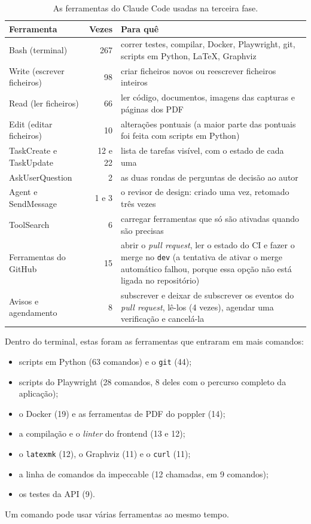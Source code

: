 \documentclass[a4paper,12pt]{article}
\begin{document}
\begin{table}[htbp]
\centering
\small
\begin{tabularx}{\textwidth}{@{}p{4.2cm}rL@{}}
\toprule
\textbf{Ferramenta} & \textbf{Vezes} & \textbf{Para quê} \\
\midrule
Bash (terminal) & 267 & correr testes, compilar, Docker, Playwright, git, scripts em Python, LaTeX, Graphviz \\
Write (escrever ficheiros) & 98 & criar ficheiros novos ou reescrever ficheiros inteiros \\
Read (ler ficheiros) & 66 & ler código, documentos, imagens das capturas e páginas dos PDF \\
Edit (editar ficheiros) & 10 & alterações pontuais (a maior parte das pontuais foi feita com scripts em Python) \\
TaskCreate e TaskUpdate & 12 e 22 & lista de tarefas visível, com o estado de cada uma \\
AskUserQuestion & 2 & as duas rondas de perguntas de decisão ao autor \\
Agent e SendMessage & 1 e 3 & o revisor de design: criado uma vez, retomado três vezes \\
ToolSearch & 6 & carregar ferramentas que só são ativadas quando são precisas \\
Ferramentas do GitHub & 15 & abrir o \textit{pull request}, ler o estado do CI e fazer o merge no \texttt{dev} (a tentativa de ativar o merge automático falhou, porque essa opção não está ligada no repositório) \\
Avisos e agendamento & 8 & subscrever e deixar de subscrever os eventos do \textit{pull request}, lê-los (4 vezes), agendar uma verificação e cancelá-la \\
\bottomrule
\end{tabularx}
\caption{As ferramentas do Claude Code usadas na terceira fase.}
\label{tab:ferramentas-assistente}
\end{table}

Dentro do terminal, estas foram as ferramentas que entraram em mais comandos:
\begin{itemize}
  \item scripts em Python (63 comandos) e o \texttt{git} (44);
  \item scripts do Playwright (28 comandos, 8 deles com o percurso completo da aplicação);
  \item o Docker (19) e as ferramentas de PDF do poppler (14);
  \item a compilação e o \textit{linter} do frontend (13 e 12);
  \item o \texttt{latexmk} (12), o Graphviz (11) e o \texttt{curl} (11);
  \item a linha de comandos da impeccable (12 chamadas, em 9 comandos);
  \item os testes da API (9).
\end{itemize}
Um comando pode usar várias ferramentas ao mesmo tempo.
\end{document}
